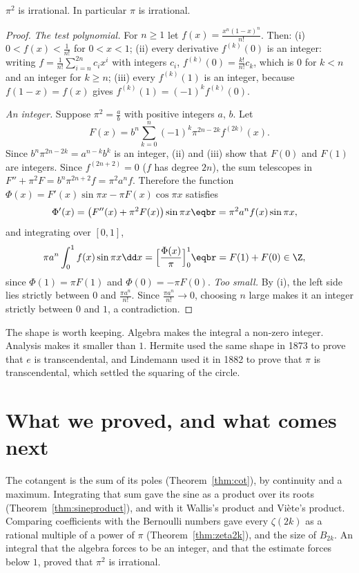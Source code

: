 \begin{theorem}\label{thm:piirrational}
$\pi^2$ is irrational. In particular $\pi$ is irrational.
\end{theorem}
\begin{proof}
\emph{The test polynomial.} For $n\ge1$ let $f(x)=\frac{x^n(1-x)^n}{n!}$. Then:
(i) $0<f(x)<\frac1{n!}$ for $0<x<1$;
(ii) every derivative $f^{(k)}(0)$ is an integer: writing $f=\frac1{n!}\sum_{i=n}^{2n}c_ix^i$ with integers $c_i$,
$f^{(k)}(0)=\frac{k!}{n!}c_k$, which is $0$ for $k<n$ and an integer for $k\ge n$;
(iii) every $f^{(k)}(1)$ is an integer, because $f(1-x)=f(x)$ gives $f^{(k)}(1)=(-1)^kf^{(k)}(0)$.

\emph{An integer.} Suppose $\pi^2=\frac ab$ with positive integers $a$, $b$. Let
\[
F(x)=b^n\sum_{k=0}^n(-1)^k\pi^{2n-2k}f^{(2k)}(x).
\]
Since $b^n\pi^{2n-2k}=a^{n-k}b^k$ is an integer, (ii) and (iii) show that $F(0)$ and $F(1)$ are integers. Since $f^{(2n+2)}=0$
($f$ has degree $2n$), the sum telescopes in $F''+\pi^2F=b^n\pi^{2n+2}f=\pi^2a^nf$. Therefore the function $\Phi(x)=F'(x)\sin\pi x-\pi F(x)\cos\pi x$ satisfies
\[
\begin{aligned}\Phi'(x)&=\bigl(F''(x)+\pi^2F(x)\bigr)\sin\pi x\eqbr=\pi^2a^nf(x)\sin\pi x,\end{aligned}
\]
and integrating over $[0,1]$,
\[
\begin{aligned}\pi a^n\int_0^1f(x)\sin\pi x\dd x&=\Bigl[\frac{\Phi(x)}\pi\Bigr]_0^1\eqbr=F(1)+F(0)\in\Z,\end{aligned}
\]
since $\Phi(1)=\pi F(1)$ and $\Phi(0)=-\pi F(0)$. \emph{Too small.} By (i), the left side lies strictly between $0$ and $\frac{\pi a^n}{n!}$. Since $\frac{\pi a^n}{n!}\to0$, choosing $n$ large makes it an
integer strictly between $0$ and $1$, a contradiction.
\end{proof}

The shape is worth keeping. Algebra makes the integral a non-zero integer. Analysis makes it smaller than $1$. Hermite used the same shape in 1873 to prove that $e$ is transcendental, and Lindemann used it in 1882 to prove that $\pi$ is transcendental, which settled the squaring of the circle.

\section{What we proved, and what comes next}

The cotangent is the sum of its poles (Theorem~\ref{thm:cot}), by continuity and a maximum. Integrating that sum gave the sine as a product over its roots (Theorem~\ref{thm:sineproduct}), and with it Wallis's product and Vi\`ete's product. Comparing coefficients with the Bernoulli numbers gave every $\zeta(2k)$ as a rational multiple of a power of $\pi$ (Theorem~\ref{thm:zeta2k}), and the size of $B_{2k}$. An integral that the algebra forces to be an integer, and that the estimate forces below $1$, proved that $\pi^2$ is irrational.


